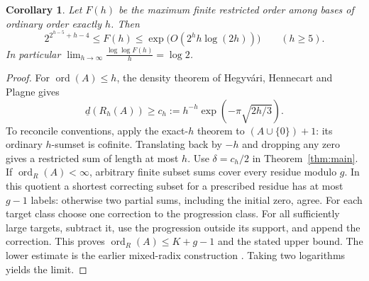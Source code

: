 \documentclass[11pt]{article}
\newtheorem{corollary}[theorem]{Corollary}
\newcommand{\lowd}{\underline{d}}
\newcommand{\ord}{\operatorname{ord}}
\newcommand{\ordR}{\operatorname{ord}_{R}}
\begin{document}
\begin{corollary}\label{growth}
Let $F(h)$ be the maximum finite restricted order among bases of ordinary order exactly $h$. Then
\[
 2^{2^{h-5}+h-4}\le F(h)\le\exp\!\bigl(O(2^h h\log(2h))\bigr)\qquad(h\ge5).
\]
In particular $\displaystyle\lim_{h\to\infty}\frac{\log\log F(h)}h=\log 2$.
\end{corollary}
\begin{proof}
For $\ord(A)\le h$, the density theorem of Hegyvári, Hennecart and Plagne \cite{HHP,Heg} gives
\[
 \lowd(R_h(A))\ge c_h:=h^{-h}\exp(-\pi\sqrt{2h/3}).
\]
To reconcile conventions, apply the exact-$h$ theorem to $(A\cup\{0\})+1$: its ordinary $h$-sumset is cofinite. Translating back by $-h$ and dropping any zero gives a restricted sum of length at most $h$. Use $\delta=c_h/2$ in Theorem~\ref{thm:main}. If $\ordR(A)<\infty$, arbitrary finite subset sums cover every residue modulo $g$. In this quotient a shortest correcting subset for a prescribed residue has at most $g-1$ labels: otherwise two partial sums, including the initial zero, agree. For each target class choose one correction to the progression class. For all sufficiently large targets, subtract it, use the progression outside its support, and append the correction. This proves $\ordR(A)\le K+g-1$ and the stated upper bound. The lower estimate is the earlier mixed-radix construction \cite[Sec.~4]{Gao}. Taking two logarithms yields the limit.
\end{proof}
\end{document}
